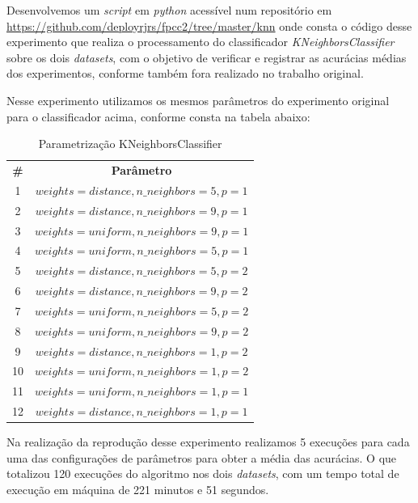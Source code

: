 \documentclass{article}
\begin{document}
Desenvolvemos um \textit{script} em \textit{python} acessível num repositório  em \url{https://github.com/deployrjrs/fpcc2/tree/master/knn} onde consta o código desse experimento que realiza o processamento do classificador \textit{KNeighborsClassifier} sobre os dois \textit{datasets}, com o objetivo de verificar e registrar as acurácias médias dos experimentos, conforme também fora realizado no trabalho original. 

Nesse experimento utilizamos os mesmos parâmetros do experimento original para o classificador acima, conforme consta na tabela abaixo:
\begin{table}[h]
\centering
\begin{tabular}{cc}
    \toprule
    \midrule
    \textbf{\#} & \textbf{Parâmetro} \\
    1 & $weights=distance, n\_neighbors=5, p=1$  \\
    2 & $weights=distance, n\_neighbors=9, p=1$ \\
    3 & $weights=uniform, n\_neighbors=9, p=1$ \\
    4 & $weights=uniform, n\_neighbors=5, p=1$ \\
    5 & $weights=distance, n\_neighbors=5, p=2$ \\
    6 & $weights=distance, n\_neighbors=9, p=2$ \\
    7 & $weights=uniform, n\_neighbors=5, p=2$ \\
    8 & $weights=uniform, n\_neighbors=9, p=2$ \\
    9 & $weights=distance, n\_neighbors=1, p=2$  \\
    10 & $weights=uniform, n\_neighbors=1, p=2$ \\
    11 & $weights=uniform, n\_neighbors=1, p=1$ \\
    12 & $weights=distance, n\_neighbors=1, p=1$ \\
\bottomrule
\end{tabular}
\caption{Parametrização KNeighborsClassifier}
\label{tab:tabela1}
\end{table}

Na realização da reprodução desse experimento realizamos 5 execuções para cada uma das configurações de parâmetros para obter a média das acurácias. O que totalizou 120 execuções do algoritmo nos dois \textit{datasets}, com um tempo total de execução em máquina de 221 minutos e 51 segundos.
\end{document}
